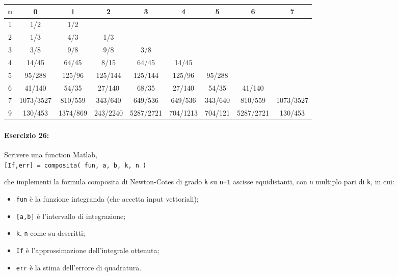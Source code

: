 \documentclass[12pt]{article}
\begin{document}
\begin{center}
\begin{adjustbox}{width=\textwidth}
\begin{tabular}{||c || c | c | c | c | c | c | c | c ||} 
     \hline
     
     n & 0 & 1 & 2 & 3 & 4 & 5 & 6 & 7\\
     \hline\hline
     1 & 1/2 & 1/2 & & & & & & \\ 
     \hline
     2 & 1/3 & 4/3 & 1/3 & & & & & \\
     \hline
     3 & 3/8 & 9/8 & 9/8 & 3/8 & & & & \\
     \hline
     4 & 14/45 & 64/45 & 8/15 & 64/45 & 14/45 & & & \\
     \hline
     5 & 95/288 & 125/96 & 125/144 & 125/144 & 125/96 & 95/288 & & \\ 
     \hline
     6 & 41/140 & 54/35 & 27/140 & 68/35 & 27/140 & 54/35 & 41/140 & \\  
     \hline
     7 & 1073/3527 & 810/559 & 343/640 & 649/536 & 649/536 & 343/640 & 810/559 & 1073/3527\\  
     \hline
     9 & 130/453 & 1374/869 & 243/2240 & 5287/2721 & 704/1213 & 704/121 & 5287/2721 & 130/453\\
     \hline
\end{tabular}
\end{adjustbox}
\end{center}



\paragraph{Esercizio 26:}
Scrivere una function Matlab, \\

\texttt{[If,err] = composita( fun, a, b, k, n )}

che implementi la formula composita di Newton-Cotes di grado \texttt{k} su \texttt{n+1} ascisse equidistanti, con \texttt{n}
multiplo pari di \texttt{k}, in cui:

\begin{itemize}
    \item \texttt{fun} è la funzione integranda (che accetta input vettoriali);
    \item \texttt{[a,b]} è l’intervallo di integrazione;
    \item \texttt{k}, \texttt{n} come su descritti;
    \item \texttt{If} è l’approssimazione dell’integrale ottenuta;
    \item \texttt{err} è la stima dell’errore di quadratura.
\end{itemize}
\end{document}
